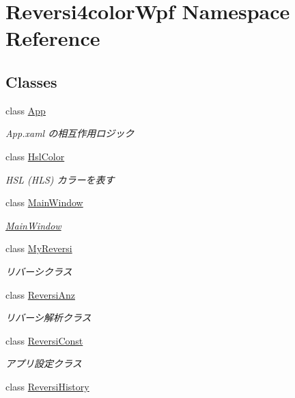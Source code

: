 \hypertarget{namespace_reversi4color_wpf}{}\section{Reversi4color\+Wpf Namespace Reference}
\label{namespace_reversi4color_wpf}
\subsection*{Classes}
\begin{DoxyCompactItemize}
\item 
class \hyperlink{class_reversi4color_wpf_1_1_app}{App}
\begin{DoxyCompactList}\small\item\em App.\+xaml の相互作用ロジック \end{DoxyCompactList}\item 
class \hyperlink{class_reversi4color_wpf_1_1_hsl_color}{Hsl\+Color}
\begin{DoxyCompactList}\small\item\em H\+SL (H\+LS) カラーを表す \end{DoxyCompactList}\item 
class \hyperlink{class_reversi4color_wpf_1_1_main_window}{Main\+Window}
\begin{DoxyCompactList}\small\item\em \hyperlink{class_reversi4color_wpf_1_1_main_window}{Main\+Window} \end{DoxyCompactList}\item 
class \hyperlink{class_reversi4color_wpf_1_1_my_reversi}{My\+Reversi}
\begin{DoxyCompactList}\small\item\em リバーシクラス \end{DoxyCompactList}\item 
class \hyperlink{class_reversi4color_wpf_1_1_reversi_anz}{Reversi\+Anz}
\begin{DoxyCompactList}\small\item\em リバーシ解析クラス \end{DoxyCompactList}\item 
class \hyperlink{class_reversi4color_wpf_1_1_reversi_const}{Reversi\+Const}
\begin{DoxyCompactList}\small\item\em アプリ設定クラス \end{DoxyCompactList}\item 
class \hyperlink{class_reversi4color_wpf_1_1_reversi_history}{Reversi\+History}

\end{DoxyCompactItemize}
